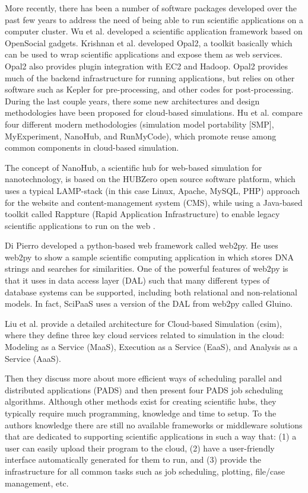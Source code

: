 \documentclass[10pt,reprint]{socc14}
\begin{document}
 More recently, there has been a number of software packages developed over the past few years to address the need of being able to run scientific applications on a computer cluster. Wu et al. \cite{wu10} developed a scientific application framework based on OpenSocial gadgets.  Krishnan et al. \cite{krishnan10} developed Opal2, a toolkit basically which can be used to wrap scientific applications and expose them as web services.   Opal2 also provides plugin integration with EC2 and Hadoop.  Opal2 provides much of the backend infrastructure for running applications, but relies on other software such as Kepler for pre-processing, and other codes for post-processing.  
During the last couple years, there some new architectures and design methodologies have been proposed for cloud-based simulations.  Hu et al. \cite{hu13} compare four different modern methodologies (simulation model portability [SMP], MyExperiment, NanoHub, and RunMyCode), which promote reuse among common components in cloud-based simulation.  

The concept of NanoHub, a scientific hub for web-based simulation for nanotechnology, is based on the HUBZero open source software platform, which uses a typical LAMP-stack (in this case Linux, Apache, MySQL, PHP) approach for the website and content-management system (CMS), while using a Java-based toolkit called Rappture (Rapid Application Infrastructure) to enable legacy scientific applications to run on the web \cite{mclennan10}.

Di Pierro \cite{dipierro11} developed a python-based web framework called web2py.  He uses web2py to show a sample scientific computing application in which stores DNA strings and searches for similarities.  One of the powerful features of web2py is that it uses in data access layer (DAL) such that many different types of database systems can be supported, including both relational and non-relational models.  In fact, SciPaaS uses a version of the DAL from web2py called Gluino.

Liu et al. \cite{liu12} provide a detailed architecture for Cloud-based Simulation (csim), where they define three key cloud services related to simulation in the cloud: Modeling as a Service (MaaS), Execution as a Service (EaaS), and Analysis as a Service (AaaS).  

Then they discuss more about more efficient ways of scheduling parallel and distributed applications (PADS) and then present four PADS job scheduling algorithms. 
Although other methods exist for creating scientific hubs, they typically require much programming, knowledge and time to setup.  To the authors knowledge there are still no available frameworks or middleware solutions that are dedicated to supporting scientific applications in such a way that: (1) a user can easily upload their program to the cloud, (2) have a user-friendly interface automatically generated for them to run, and (3) provide the infrastructure for all common tasks such as job scheduling, plotting, file/case management, etc.
\end{document}
